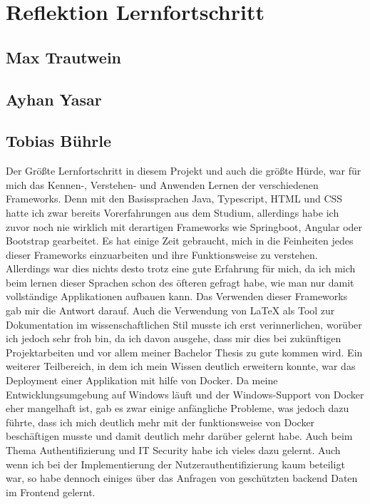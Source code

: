 \chapter{Reflektion Lernfortschritt}\label{ch:reflektion-lernfortschritt}


\section{Max Trautwein}


\section{Ayhan Yasar}


\section{Tobias Bührle}
Der Größte Lernfortschritt in diesem Projekt und auch die größte Hürde, war für mich das 
Kennen-, Verstehen- und Anwenden Lernen der verschiedenen Frameworks. Denn mit den 
Basissprachen Java, Typescript, HTML und CSS hatte ich zwar bereits Vorerfahrungen aus dem 
Studium, allerdings habe ich zuvor noch nie wirklich mit derartigen Frameworks wie 
Springboot, Angular oder Bootstrap gearbeitet. Es hat einige Zeit gebraucht, mich in die 
Feinheiten jedes dieser Frameworks einzuarbeiten und ihre Funktionsweise zu verstehen. 
Allerdings war dies nichts desto trotz eine gute Erfahrung für mich, da ich mich beim 
lernen dieser Sprachen schon des öfteren gefragt habe, wie man nur damit vollständige 
Applikationen aufbauen kann. Das Verwenden dieser Frameworks gab mir die Antwort darauf.
Auch die Verwendung von LaTeX als Tool zur Dokumentation im wissenschaftlichen Stil 
musste ich erst verinnerlichen, worüber ich jedoch sehr froh bin, da ich davon ausgehe, 
dass mir dies bei zukünftigen Projektarbeiten und vor allem meiner Bachelor Thesis zu gute 
kommen wird. Ein weiterer Teilbereich, in dem ich mein Wissen deutlich erweitern konnte, 
war das Deployment einer Applikation mit hilfe von Docker. Da meine Entwicklungsumgebung 
auf Windows läuft und der Windows-Support von Docker eher mangelhaft ist, gab es zwar 
einige anfängliche Probleme, was jedoch dazu führte, dass ich mich deutlich mehr 
mit der funktionsweise von Docker beschäftigen musste und damit deutlich mehr darüber 
gelernt habe. Auch beim Thema Authentifizierung und IT Security habe ich vieles dazu 
gelernt. Auch wenn ich bei der Implementierung der Nutzerauthentifizierung kaum beteiligt 
war, so habe dennoch einiges über das Anfragen von geschützten backend Daten im 
Frontend gelernt.
